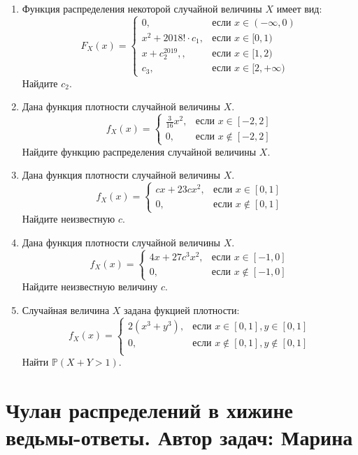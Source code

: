 \documentclass[a4paper,12pt]{article}
\def \P{\mathbb{P}}
\begin{document}
\begin{enumerate} %
\item %
Функция распределения некоторой случайной величины $X$ имеет вид:
\[
F_X(x) =
\begin{cases}
0,&\text{если } x\in(-\infty , 0) \\
x^2 + 2018! \cdot c_1,&\text{если } x\in[0, 1) \\
x + c_2^{2019}, ,&\text{если } x\in[1, 2) \\
c_3, &\text{если } x\in[2, +\infty)
\end{cases}
\]
Найдите $c_2$.
\item %
Дана функция плотности случайной величины $X$.
\[
f_X(x) =
\begin{cases}
\frac{3}{16}x^2,&\text{если } x\in[-2, 2] \\
0,&\text{если } x\notin[-2, 2]
\end{cases}
\]
Найдите функцию распределения случайной величины $X$.
\item %
Дана функция плотности случайной величины $X$.
\[
f_X(x) =
\begin{cases}
cx+23cx^2,&\text{если } x\in[0, 1] \\
0,&\text{если } x\notin[0, 1]
\end{cases}
\]
Найдите неизвестную $c$.
\item %
Дана функция плотности случайной величины $X$.
\[
f_X(x) =
\begin{cases}
4x + 27c^3x^2,&\text{если } x\in[-1, 0] \\
0,&\text{если } x\notin[-1, 0]
\end{cases}
\]
Найдите неизвестную величину $c$.
\item %
Случайная величина $X$ задана фукцией плотности:
\[
f_X(x) =
\begin{cases}
2(x^3+y^3),&\text{если } x\in[0, 1], y\in[0, 1] \\
0,&\text{если } x\notin[0, 1], y\notin[0, 1] \\
\end{cases}
\]
Найти $\P(X + Y > 1)$.
\end{enumerate}

\newpage
\section{Чулан распределений в хижине ведьмы-ответы. Автор задач: Марина}
\end{document}
